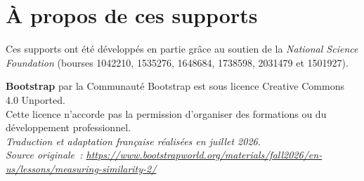 \documentclass[12pt,a4paper]{article}
\begin{document}
\section*{À propos de ces supports}

Ces supports ont été développés en partie grâce au soutien de la \emph{National Science Foundation} (bourses 1042210, 1535276, 1648684, 1738598, 2031479 et 1501927).

\begin{center}
  \textbf{Bootstrap} par la Communauté Bootstrap est sous licence Creative Commons 4.0 Unported.\\
  Cette licence n'accorde pas la permission d'organiser des formations ou du développement professionnel.\\[1em]
  \textit{Traduction et adaptation française réalisées en juillet 2026.}\\
  \textit{Source originale~: \url{https://www.bootstrapworld.org/materials/fall2026/en-us/lessons/measuring-similarity-2/}}
\end{center}
\end{document}
